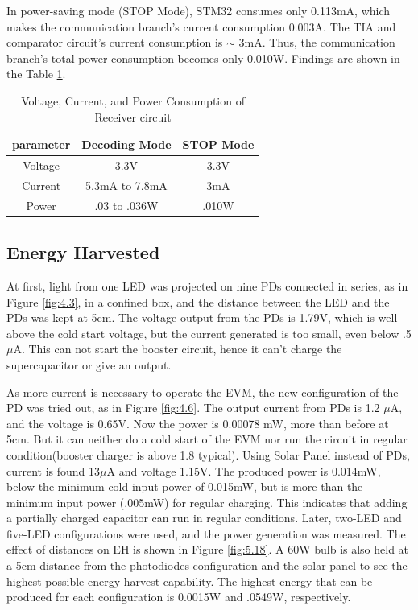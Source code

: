 In power-saving mode (STOP Mode), STM32 consumes only 0.113mA, which makes the communication branch's current consumption 0.003A. The TIA and comparator circuit's current consumption is  \(\sim\) 3mA. Thus, the communication branch's total power consumption becomes only 0.010W. Findings are shown in the Table \ref{tab:5.3}.

\begin{table}
    \centering
    \caption{Voltage, Current, and Power Consumption of Receiver circuit}
    \begin{tabular}{|c|c|c|}
    \hline
         \textbf{parameter} &\textbf{Decoding Mode}  &\textbf{STOP Mode} \\
         \hline
         Voltage &3.3V  &3.3V   \\
         \hline
         Current &5.3mA to 7.8mA &3mA   \\
         \hline
         Power &.03 to .036W  &.010W   \\
         \hline
    \end{tabular}
    \label{tab:5.3}
\end{table}

\subsection{Energy Harvested}

At first, light from one LED was projected on nine \ac{PD}s connected in series, as in Figure \ref{fig:4.3}, in a confined box, and the distance between the LED and the \ac{PD}s was kept at 5cm. The voltage output from the \ac{PD}s is 1.79V, which is well above the cold start voltage, but the current generated is too small, even below .5\(\mu\)A. This can not start the booster circuit, hence it can't charge the supercapacitor or give an output. 


As more current is necessary to operate the \ac{EVM}, the new configuration of the \ac{PD} was tried out, as in Figure \ref{fig:4.6}. The output current from \ac{PD}s is 1.2 \(\mu\)A, and the voltage is 0.65V. Now the power is 0.00078 mW, more than before at 5cm. But it can neither do a cold start of the \ac{EVM} nor run the circuit in regular condition(booster charger is above 1.8 typical). Using Solar Panel instead of \ac{PD}s, current is found 13\(\mu\)A and voltage 1.15V. The produced power is 0.014mW, below the minimum cold input power of 0.015mW, but is more than the minimum input power (.005mW) for regular charging. This indicates that adding a partially charged capacitor can run in regular conditions. Later, two-LED and five-LED configurations were used, and the power generation was measured. The effect of distances on \ac{EH} is shown in Figure \ref{fig:5.18}. A 60W bulb is also held at a 5cm distance from the photodiodes configuration and the solar panel to see the highest possible energy harvest capability. The highest energy that can be produced for each configuration is 0.0015W and .0549W, respectively.

